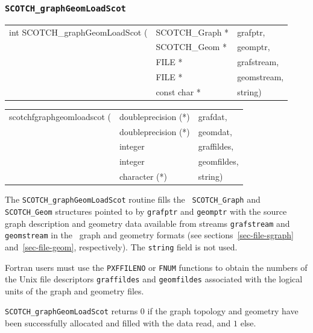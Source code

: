 \subsubsection{{\tt SCOTCH\_graphGeomLoadScot}}

\begin{itemize}
\progsyn

{\tt\begin{tabular}{l@{}ll}
int SCOTCH\_graphGeomLoadScot ( & SCOTCH\_Graph * & grafptr,    \\
                                & SCOTCH\_Geom *  & geomptr,    \\
                                & FILE *          & grafstream, \\
                                & FILE *          & geomstream, \\
                                & const char *    & string)
\end{tabular}}

{\tt\begin{tabular}{l@{}ll}
scotchfgraphgeomloadscot ( & doubleprecision (*) & grafdat,    \\
                           & doubleprecision (*) & geomdat,    \\
                           & integer             & graffildes, \\
                           & integer             & geomfildes, \\
                           & character (*)       & string)
\end{tabular}}

\progdes

The {\tt SCOTCH\_graphGeomLoadScot} routine fills the {\tt
SCOTCH\_\lbt Graph} and {\tt SCOTCH\_\lbt Geom} structures pointed to
by {\tt grafptr} and {\tt geomptr} with the source graph description
and geometry data available from streams {\tt graf\lbt stream} and
{\tt geom\lbt stream} in the \scotch\ graph and geometry formats
(see sections~\ref{sec-file-sgraph} and~\ref{sec-file-geom},
respectively). The {\tt string} field is not used.

Fortran users must use the {\tt PXFFILENO} or {\tt FNUM} functions to
obtain the numbers of the Unix file descriptors {\tt graf\lbt fildes}
and {\tt geom\lbt fildes} associated with the logical units of the
graph and geometry files.

\progret

{\tt SCOTCH\_graphGeomLoadScot} returns $0$ if the graph topology and
geometry have been successfully allocated and filled with the data
read, and $1$ else.
\end{itemize}

